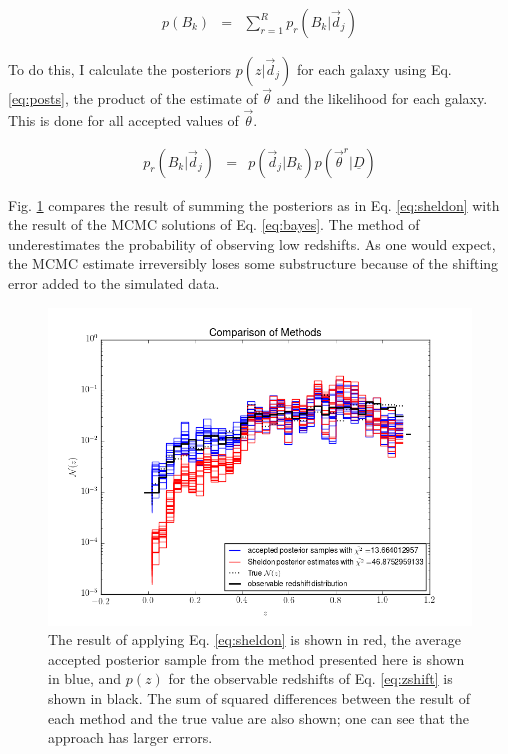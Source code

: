 \documentclass[12pt, onecolumn]{emulateapj}
\newcommand{\textul}{\underline}
\begin{document}
\begin{eqnarray}
\label{eq:sheldon}
p(B_{k}) &=& \sum_{r=1}^{R}p_{r}(B_{k}|\vec{d}_{j})
\end{eqnarray}

To do this, I calculate the posteriors $p(z|\vec{d}_{j})$ for each galaxy using Eq. \ref{eq:posts}, the product of the estimate of $\vec{\theta}$ and the likelihood for each galaxy.  This is done for all accepted values of $\vec{\theta}$.

\begin{eqnarray}
\label{eq:posts}
p_{r}(B_{k}|\vec{d}_{j}) &=& p(\vec{d}_{j}|B_{k})p(\vec{\theta}^{r}|\textul{D})
\end{eqnarray}

Fig. \ref{fig:sheldon} compares the result of summing the posteriors as in Eq. \ref{eq:sheldon} with the result of the MCMC solutions of Eq. \ref{eq:bayes}.  The method of \citet{she11} underestimates the probability of observing low redshifts.  As one would expect, the MCMC estimate irreversibly loses some substructure because of the shifting error added to the simulated data.

\begin{figure}
\label{fig:sheldon}
\includegraphics[scale=0.5]{compare-sheldon.png}
\caption{The result of applying Eq. \ref{eq:sheldon} is shown in red, the average accepted posterior sample from the method presented here is shown in blue, and $p(z)$ for the observable redshifts of Eq. \ref{eq:zshift} is shown in black.  The sum of squared differences between the result of each method and the true value are also shown; one can see that the \citet{she11} approach has larger errors.}
\end{figure}
\end{document}
